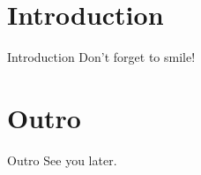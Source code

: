 \documentclass{beamer}
\begin{document}
    \section{Introduction}
        \begin{frame}{Introduction}
            Don't forget to smile!
        \end{frame}
    \section{Outro}
        \begin{frame}{Outro}
            See you later.
        \end{frame}
\end{document}
